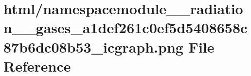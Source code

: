 \hypertarget{namespacemodule____radiation____gases__a1def261c0ef5d5408658c87b6dc08b53__icgraph_8png}{}\section{html/namespacemodule\+\_\+\+\_\+radiation\+\_\+\+\_\+gases\+\_\+a1def261c0ef5d5408658c87b6dc08b53\+\_\+icgraph.png File Reference}
\label{namespacemodule____radiation____gases__a1def261c0ef5d5408658c87b6dc08b53__icgraph_8png}
